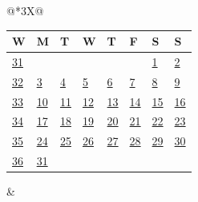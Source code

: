 \begin{tabularx}{\linewidth}{@{}*{3}{X}@{}}
{{\begin{tabularx}{\linewidth}{Y|*{7}{Y}}
  W & M & T & W & T & F & S & S \\ \hline
  \hyperlink{Week 31}{31} &&&&&&\hyperlink{Week 31}{\textcolor{gray!60!black}{1}}&\hyperlink{Week 31}{\textcolor{red!70!black}{2}}\\ 
  \hyperlink{Week 32}{32} &\hyperlink{Week 32}{3}&\hyperlink{Week 32}{4}&\hyperlink{Week 32}{5}&\hyperlink{Week 32}{6}&\hyperlink{Week 32}{7}&\hyperlink{Week 32}{\textcolor{gray!60!black}{8}}&\hyperlink{Week 32}{\textcolor{red!70!black}{9}}\\ 
  \hyperlink{Week 33}{33} &\hyperlink{Week 33}{10}&\hyperlink{Week 33}{11}&\hyperlink{Week 33}{12}&\hyperlink{Week 33}{13}&\hyperlink{Week 33}{14}&\hyperlink{Week 33}{\textcolor{gray!60!black}{15}}&\hyperlink{Week 33}{\textcolor{red!70!black}{16}}\\ 
  \hyperlink{Week 34}{34} &\hyperlink{Week 34}{17}&\hyperlink{Week 34}{18}&\hyperlink{Week 34}{19}&\hyperlink{Week 34}{20}&\hyperlink{Week 34}{21}&\hyperlink{Week 34}{\textcolor{gray!60!black}{22}}&\hyperlink{Week 34}{\textcolor{red!70!black}{23}}\\ 
  \hyperlink{Week 35}{35} &\hyperlink{Week 35}{24}&\hyperlink{Week 35}{25}&\hyperlink{Week 35}{26}&\hyperlink{Week 35}{27}&\hyperlink{Week 35}{28}&\hyperlink{Week 35}{\textcolor{gray!60!black}{29}}&\hyperlink{Week 35}{\textcolor{red!70!black}{30}}\\ 
  \hyperlink{Week 36}{36} &\hyperlink{Week 36}{31}&&&&&&\\ 
  \end{tabularx}}
} & 
\end{tabularx}
